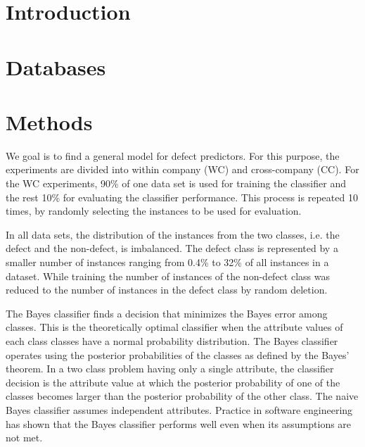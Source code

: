 \documentclass{sig-alternate}
\begin{document}
\maketitle
\begin{abstract}
\end {abstract}


\section{Introduction}
\section{Databases}


\section{Methods}
We goal is to find a general model for defect predictors. For this purpose, the experiments are divided into  
within company (WC) and cross-company (CC). For the WC experiments, 90\% of one data set 
is used for training the classifier and the rest 10\% for evaluating the classifier performance. This process is 
repeated 10 times, by randomly selecting the instances to be used for evaluation. 

In all data sets, the distribution of the instances from the two classes, i.e. the defect and the 
non-defect, is imbalanced. The defect class is represented by a smaller number of instances 
 ranging  from 0.4\% to 32\% of all instances in a dataset. While training the number of instances of the 
 non-defect class was reduced to the number of instances in the defect class by random deletion. 

The Bayes classifier finds a decision that minimizes the Bayes error among classes. This is the 
theoretically optimal classifier when the attribute values of each class classes have a normal probability 
distribution. The Bayes classifier operates using the posterior probabilities of the classes as defined by 
the Bayes' theorem. In a two class problem having only a single attribute, the classifier decision is the 
attribute value at which the posterior probability of one of the classes becomes larger than the posterior 
probability of the other class. The naive Bayes classifier assumes independent attributes. 
Practice in software engineering has shown that the Bayes classifier performs well even when its 
assumptions are not met. 
\end{document}
